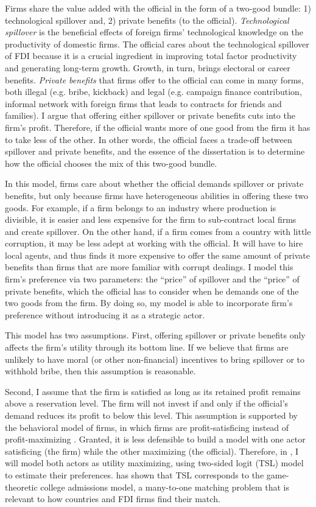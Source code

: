 Firms share the value added with the official in the form of a two-good bundle: 1) technological spillover and, 2) private benefits (to the official). \textit{Technological spillover} is the beneficial effects of foreign firms' technological knowledge on the productivity of domestic firms. The official cares about the technological spillover of FDI because it is a crucial ingredient in improving total factor productivity and generating long-term growth. Growth, in turn, brings electoral or career benefits. \textit{Private benefits} that firms offer to the official can come in many forms, both illegal (e.g. bribe, kickback) and legal (e.g. campaign finance contribution, informal network with foreign firms that leads to contracts for friends and families). I argue that offering either spillover or private benefits cuts into the firm's profit. Therefore, if the official wants more of one good from the firm it has to take less of the other. In other words, the official faces a trade-off between spillover and private benefits, and the essence of the dissertation is to determine how the official chooses the mix of this two-good bundle.

In this model, firms care about whether the official demands spillover or private benefits, but only because firms have heterogeneous abilities in offering these two goods. For example, if a firm belongs to an industry where production is divisible, it is easier and less expensive for the firm to sub-contract local firms and create spillover. On the other hand, if a firm comes from a country with little corruption, it may be less adept at working with the official. It will have to hire local agents, and thus finds it more expensive to offer the same amount of private benefits than firms that are more familiar with corrupt dealings. I model this firm's preference via two parameters: the ``price'' of spillover and the ``price'' of private benefits, which the official has to consider when he demands one of the two goods from the firm. By doing so, my model is able to incorporate firm's preference without introducing it as a strategic actor.

This model has two assumptions. First, offering spillover or private benefits only affects the firm's utility through its bottom line. If we believe that firms are unlikely to have moral (or other non-financial) incentives to bring spillover or to withhold bribe, then this assumption is reasonable. 

Second, I assume that the firm is satisfied as long as its retained profit remains above a reservation level. The firm will not invest if and only if the official's demand reduces its profit to below this level. This assumption is supported by the behavioral model of firms, in which firms are profit-satisficing instead of profit-maximizing \citep{Simon1959}. Granted, it is less defensible to build a model with one actor satisficing (the firm) while the other maximizing (the official). Therefore, in , I will model both actors as utility maximizing, using two-sided logit (TSL) model to estimate their preferences. \citet{Logan1996a} has shown that TSL corresponds to the game-theoretic college admissions model, a many-to-one matching problem that is relevant to how countries and FDI firms find their match.


